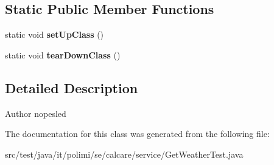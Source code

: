 \subsection*{Static Public Member Functions}
\begin{DoxyCompactItemize}
\item 
\hypertarget{classit_1_1polimi_1_1se_1_1calcare_1_1service_1_1GetWeatherTest_add03859f5e8595f75b3ffa3d200ff22b}{}static void {\bfseries set\+Up\+Class} ()\label{classit_1_1polimi_1_1se_1_1calcare_1_1service_1_1GetWeatherTest_add03859f5e8595f75b3ffa3d200ff22b}

\item 
\hypertarget{classit_1_1polimi_1_1se_1_1calcare_1_1service_1_1GetWeatherTest_a53dd402f0edb76ae19be13c9f9f56e24}{}static void {\bfseries tear\+Down\+Class} ()\label{classit_1_1polimi_1_1se_1_1calcare_1_1service_1_1GetWeatherTest_a53dd402f0edb76ae19be13c9f9f56e24}

\end{DoxyCompactItemize}


\subsection{Detailed Description}
\begin{DoxyAuthor}{Author}
nopesled 
\end{DoxyAuthor}


The documentation for this class was generated from the following file\+:\begin{DoxyCompactItemize}
\item 
src/test/java/it/polimi/se/calcare/service/Get\+Weather\+Test.\+java\end{DoxyCompactItemize}
